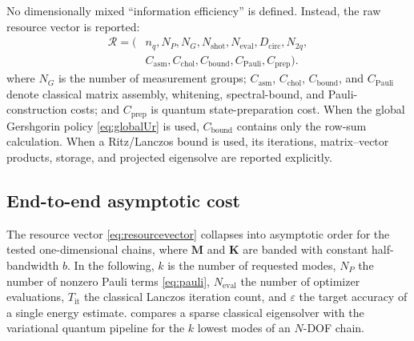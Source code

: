 \documentclass{ieeeaccess}
\newcommand{\M}{\mathbf{M}}
\newcommand{\K}{\mathbf{K}}
\begin{document}
No dimensionally mixed ``information efficiency'' is defined. Instead, the raw resource vector is reported:
\begin{equation}
\begin{aligned}
\mathcal R=(&n_q,N_P,N_G,N_{\mathrm{shot}},N_{\mathrm{eval}},D_{\mathrm{circ}},N_{2q},\\
&C_{\mathrm{asm}},C_{\mathrm{chol}},C_{\mathrm{bound}},C_{\mathrm{Pauli}},C_{\mathrm{prep}}).
\end{aligned}
\label{eq:resourcevector}
\end{equation}
where $N_G$ is the number of measurement groups; $C_{\mathrm{asm}}$, $C_{\mathrm{chol}}$, $C_{\mathrm{bound}}$, and $C_{\mathrm{Pauli}}$ denote classical matrix assembly, whitening, spectral-bound, and Pauli-construction costs; and $C_{\mathrm{prep}}$ is quantum state-preparation cost. When the global Gershgorin policy \cref{eq:globalUr} is used, $C_{\mathrm{bound}}$ contains only the row-sum calculation. When a Ritz/Lanczos bound is used, its iterations, matrix--vector products, storage, and projected eigensolve are reported explicitly.

\subsection{End-to-end asymptotic cost}
\label{sec:complexity}

The resource vector \cref{eq:resourcevector} collapses into asymptotic order for the tested one-dimensional chains, where $\M$ and $\K$ are banded with constant half-bandwidth $b$. In the following, $k$ is the number of requested modes, $N_P$ the number of nonzero Pauli terms \eqref{eq:pauli}, $N_{\mathrm{eval}}$ the number of optimizer evaluations, $T_{\mathrm{it}}$ the classical Lanczos iteration count, and $\varepsilon$ the target accuracy of a single energy estimate.  compares a sparse classical eigensolver with the variational quantum pipeline for the $k$ lowest modes of an $N$-DOF chain.
\end{document}
